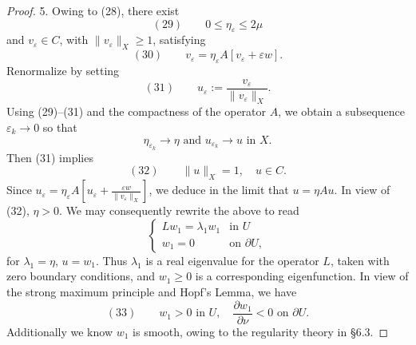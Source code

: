 \begin{proof}
5. Owing to (28), there exist
$$(29) \qquad 0 \leq \eta_\varepsilon \leq 2\mu$$
and $v_\varepsilon \in C$, with $\|v_\varepsilon\|_X \geq 1$, satisfying
$$(30) \qquad v_\varepsilon = \eta_\varepsilon A[v_\varepsilon + \varepsilon w].$$
Renormalize by setting
$$(31) \qquad u_\varepsilon := \frac{v_\varepsilon}{\|v_\varepsilon\|_X}.$$
Using (29)--(31) and the compactness of the operator $A$, we obtain a subsequence $\varepsilon_k \to 0$ so that
$$\eta_{\varepsilon_k} \to \eta \text{ and } u_{\varepsilon_k} \to u \text{ in } X.$$
Then (31) implies
$$(32) \qquad \|u\|_X = 1, \quad u \in C.$$
Since $u_\varepsilon = \eta_\varepsilon A\left[u_\varepsilon + \frac{\varepsilon w}{\|v_\varepsilon\|_X}\right]$, we deduce in the limit that $u = \eta Au$. In view of (32), $\eta > 0$. We may consequently rewrite the above to read
$$\begin{cases} Lw_1 = \lambda_1w_1 & \text{in } U \\ w_1 = 0 & \text{on } \partial U, \end{cases}$$
for $\lambda_1 = \eta$, $u = w_1$. Thus $\lambda_1$ is a real eigenvalue for the operator $L$, taken with zero boundary conditions, and $w_1 \geq 0$ is a corresponding eigenfunction. In view of the strong maximum principle and Hopf's Lemma, we have
$$(33) \qquad w_1 > 0 \text{ in } U, \quad \frac{\partial w_1}{\partial\nu} < 0 \text{ on } \partial U.$$
Additionally we know $w_1$ is smooth, owing to the regularity theory in \S6.3.


\end{proof}
